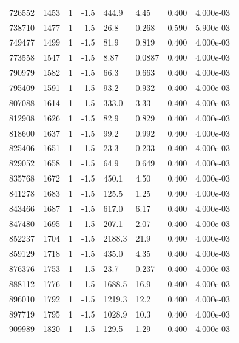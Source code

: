 \documentclass[preview]{standalone}
\begin{document}
{{{{{{{{{{{\begin{tabular}{L{1.2cm}C{1.2cm} C{0.3cm}C{0.5cm} C{1.4cm}C{1.4cm} C{1.4cm}C{1.4cm}}
  726552  &  1453  & 1     & -1.5 &  444.9  & 4.45  & 0.400 &  4.000e-03   \\ 
  738710  &  1477  & 1     & -1.5 &  26.8  & 0.268  & 0.590 &  5.900e-03   \\ 
  749477  &  1499  & 1     & -1.5 &  81.9  & 0.819  & 0.400 &  4.000e-03   \\ 
  773558  &  1547  & 1     & -1.5 &  8.87  & 0.0887  & 0.400 &  4.000e-03   \\ 
  790979  &  1582  & 1     & -1.5 &  66.3  & 0.663  & 0.400 &  4.000e-03   \\ 
  795409  &  1591  & 1     & -1.5 &  93.2  & 0.932  & 0.400 &  4.000e-03   \\ 
  807088  &  1614  & 1     & -1.5 &  333.0  & 3.33  & 0.400 &  4.000e-03   \\ 
  812908  &  1626  & 1     & -1.5 &  82.9  & 0.829  & 0.400 &  4.000e-03   \\ 
  818600  &  1637  & 1     & -1.5 &  99.2  & 0.992  & 0.400 &  4.000e-03   \\ 
  825406  &  1651  & 1     & -1.5 &  23.3  & 0.233  & 0.400 &  4.000e-03   \\ 
  829052  &  1658  & 1     & -1.5 &  64.9  & 0.649  & 0.400 &  4.000e-03   \\ 
  835768  &  1672  & 1     & -1.5 &  450.1  & 4.50  & 0.400 &  4.000e-03   \\ 
  841278  &  1683  & 1     & -1.5 &  125.5  & 1.25  & 0.400 &  4.000e-03   \\ 
  843466  &  1687  & 1     & -1.5 &  617.0  & 6.17  & 0.400 &  4.000e-03   \\ 
  847480  &  1695  & 1     & -1.5 &  207.1  & 2.07  & 0.400 &  4.000e-03   \\ 
  852237  &  1704  & 1     & -1.5 &  2188.3  & 21.9  & 0.400 &  4.000e-03   \\ 
  859129  &  1718  & 1     & -1.5 &  435.0  & 4.35  & 0.400 &  4.000e-03   \\ 
  876376  &  1753  & 1     & -1.5 &  23.7  & 0.237  & 0.400 &  4.000e-03   \\ 
  888112  &  1776  & 1     & -1.5 &  1688.5  & 16.9  & 0.400 &  4.000e-03   \\ 
  896010  &  1792  & 1     & -1.5 &  1219.3  & 12.2  & 0.400 &  4.000e-03   \\ 
  897719  &  1795  & 1     & -1.5 &  1028.9  & 10.3  & 0.400 &  4.000e-03   \\ 
  909989  &  1820  & 1     & -1.5 &  129.5  & 1.29  & 0.400 &  4.000e-03   \\ 

\end{tabular}}}}}}}}}}}}
\end{document}
